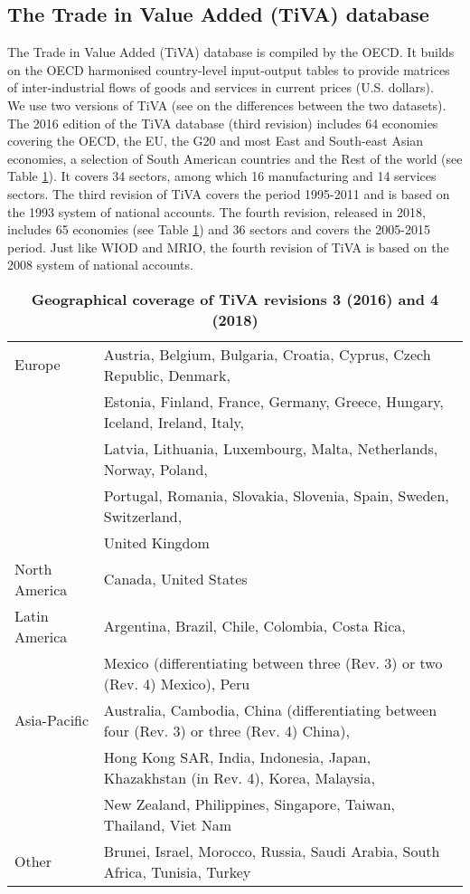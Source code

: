 \documentclass[11pt,a4paper]{paper} %
\begin{document}
\subsection{The Trade in Value Added (TiVA) database}
The Trade in Value Added (TiVA) database is compiled by the OECD. 
It builds on the OECD harmonised country-level input-output tables to provide matrices of inter-industrial flows of goods and services in current prices (U.S. dollars).\\
We use two versions of TiVA (see \cite{OECD2018} on the differences between the two datasets).
The 2016 edition of the TiVA database (third revision) includes 64 economies covering the OECD, the EU, the G20 and most East and South-east Asian economies, a selection of South American countries and the Rest of the world (see Table \ref{tab:tiva}). It covers 34 sectors, among which 16 manufacturing and 14 services sectors. 
The third revision of TiVA covers the period 1995-2011 and is based on the 1993 system of national accounts.
The fourth revision, released in 2018, includes 65 economies (see Table \ref{tab:tiva}) and 36 sectors and covers the 2005-2015 period. 
Just like WIOD and MRIO, the fourth revision of TiVA is based on the 2008 system of national accounts.


\begin{table}[!h]
\begin{threeparttable}
\centering
\centering
\caption{\small{\textbf{Geographical coverage of TiVA revisions 3 (2016) and 4 (2018)}}}
\small
\begin{tabular}{ll}
\hline\hline
Europe & Austria, Belgium, Bulgaria, Croatia, Cyprus, Czech Republic, Denmark,\\
& Estonia, Finland, France, Germany, Greece, Hungary, Iceland, Ireland, Italy,\\
& Latvia, Lithuania, Luxembourg, Malta, Netherlands, Norway, Poland,\\
&Portugal, Romania, Slovakia, Slovenia, Spain, Sweden, Switzerland,\\
& United Kingdom\\
North  America& Canada, United States\\
Latin America & Argentina, Brazil, Chile, Colombia, Costa Rica, \\ 
&Mexico (differentiating between three (Rev. 3) or two (Rev. 4) Mexico), Peru\\
Asia-Pacific & Australia, Cambodia, China (differentiating between four (Rev. 3) or three (Rev. 4) China), \\
& Hong Kong SAR, India, Indonesia, Japan, Khazakhstan (in Rev. 4), Korea, Malaysia, \\
& New Zealand, Philippines, Singapore, Taiwan, Thailand, Viet Nam\\
Other & Brunei, Israel, Morocco, Russia, Saudi Arabia, South Africa, Tunisia, Turkey\\
\hline\hline
\end{tabular} 
\label{tab:tiva}
\end{threeparttable}
\end{table} 
\end{document}
